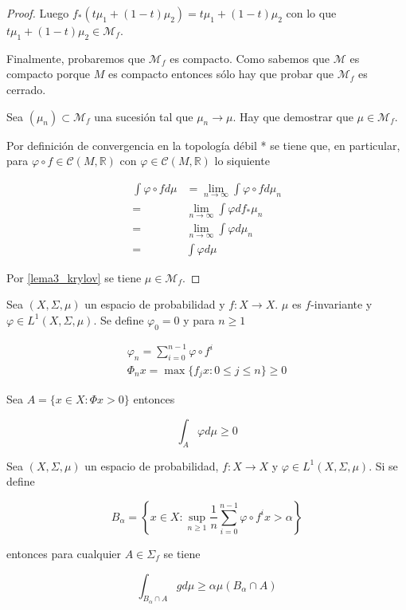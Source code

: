 \begin{proof}
	Luego $f_*(t\mu_1 + (1-t)\mu_2) = t\mu_1 + (1-t)\mu_2$ con lo que $t\mu_1 + (1-t)\mu_2 \in \mathcal{M}_f$.
	
	Finalmente, probaremos que $\mathcal{M}_f$ es compacto. Como sabemos que $\mathcal{M}$ es compacto porque $M$ es compacto entonces sólo hay que probar que $\mathcal{M}_f$ es cerrado.
	
	Sea $(\mu_n) \subset \mathcal{M}_f$ una sucesión tal que $\mu_n \rightarrow \mu$. Hay que demostrar que $\mu \in \mathcal{M}_f$.
	
	Por definición de convergencia en la topología débil * se tiene que, en particular, para $\varphi \circ f \in \mathcal{C}(M,\mathbb{R})$ con $\varphi \in \mathcal{C}(M,\mathbb{R})$ lo siquiente
	
	\begin{align}
	\int \varphi \circ f d\mu &= \lim_{n \rightarrow \infty} \int \varphi \circ f d\mu_n\\
	=& \lim_{n \rightarrow \infty} \int \varphi df_*\mu_n\\
	=& \lim_{n \rightarrow \infty} \int \varphi d\mu_n\\
	=& \int \varphi d\mu
	\end{align}
	
	Por \ref{lema3_krylov} se tiene $\mu \in \mathcal{M}_f$.
\end{proof}

\begin{teorema}
	Sea $(X,\Sigma,\mu)$ un espacio de probabilidad y $f: X \rightarrow X$. $\mu$ es $f$-invariante y $\varphi \in L^1(X,\Sigma,\mu)$. Se define $\varphi_0 = 0$ y para $n \geq 1$
	
	\begin{gather}
		\varphi_n = \sum_{i=0}^{n-1} \varphi \circ f^i\\
		\varPhi_n x = \max \{f_j x : 0 \leq j \leq n\} \geq 0
	\end{gather}
	
	Sea $A = \{x \in X: \varPhi x > 0 \}$ entonces

	\begin{equation}
		\int_A \varphi d\mu \geq 0
	\end{equation}
\end{teorema}

\begin{corolario}
	Sea $(X,\Sigma,\mu)$ un espacio de probabilidad, $f: X \rightarrow X$ y $\varphi \in L^1(X,\Sigma,\mu)$. Si se define
	
	\begin{equation}
		B_{\alpha} = \left\{ x \in X: \sup_{n \geq 1} \frac{1}{n} \sum_{i=0}^{n-1} \varphi \circ f^i x > \alpha \right\}
	\end{equation}
	
	entonces para cualquier $A \in \Sigma_f$ se tiene
	
	\begin{equation}
		\int_{B_{\alpha} \cap A} g d\mu \geq \alpha \mu(B_{\alpha} \cap A)
	\end{equation}
\end{corolario}

